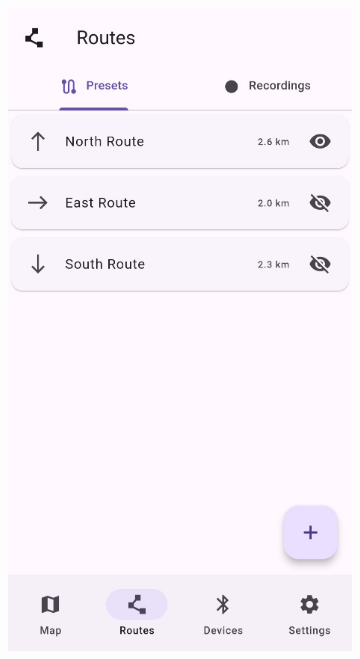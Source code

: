 \begin{figure}[!htb]
\begin{subfigure}{.25\textwidth}
        \caption{\mapscreen}
        \label{subfig:app_map_screen}
    \end{subfigure}%
    \begin{subfigure}{.25\textwidth}
        \centering
        \includegraphics[width=.8666\linewidth]{images/app_routes_screen.jpg}
        \caption{\routesscreen}
        \label{subfig:app_routes_screen}
    \end{subfigure}%
    \begin{subfigure}{.25\textwidth}
        \centering

\end{subfigure}
\end{figure}
